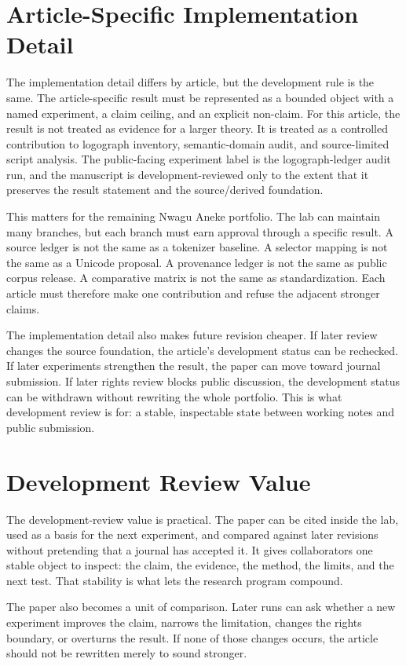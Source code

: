 \documentclass[sigconf,nonacm]{acmart}
\begin{document}
\section{Article-Specific Implementation Detail}
The implementation detail differs by article, but the development rule is the same.
The article-specific result must be represented as a bounded object with a named
experiment, a claim ceiling, and an explicit non-claim. For this article, the
result is not treated as evidence for a larger theory. It is treated as a
controlled contribution to logograph inventory, semantic-domain audit, and source-limited script analysis. The public-facing experiment label is the logograph-ledger audit run, and the manuscript is development-reviewed only to the extent that it preserves the result
statement and the source/derived foundation.

This matters for the remaining Nwagu Aneke portfolio. The lab can maintain many
branches, but each branch must earn approval through a specific result. A source
ledger is not the same as a tokenizer baseline. A selector mapping is not the
same as a Unicode proposal. A provenance ledger is not the same as public corpus
release. A comparative matrix is not the same as standardization. Each article
must therefore make one contribution and refuse the adjacent stronger claims.

The implementation detail also makes future revision cheaper. If later review
changes the source foundation, the article's development status can be
rechecked. If later experiments strengthen the result, the paper can move toward
journal submission. If later rights review blocks public discussion, the
development status can be withdrawn without rewriting the whole portfolio. This
is what development review is for: a stable, inspectable state between working
notes and public submission.

\section{Development Review Value}
The development-review value is practical. The paper can be cited inside the lab,
used as a basis for the next experiment, and compared against later revisions
without pretending that a journal has accepted it. It gives collaborators one
stable object to inspect: the claim, the evidence, the method, the limits, and
the next test. That stability is what lets the research program compound.

The paper also becomes a unit of comparison. Later runs can ask whether a new
experiment improves the claim, narrows the limitation, changes the rights
boundary, or overturns the result. If none of those changes occurs, the article
should not be rewritten merely to sound stronger.
\end{document}
